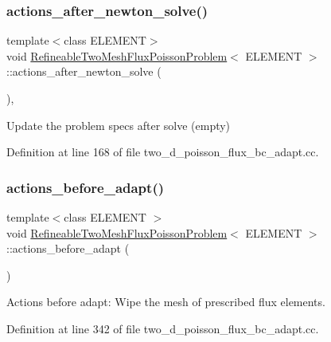 \subsubsection{\texorpdfstring{actions\+\_\+after\+\_\+newton\+\_\+solve()}{actions\_after\_newton\_solve()}}
{\footnotesize\ttfamily template$<$class E\+L\+E\+M\+E\+NT$>$ \\
void \hyperlink{classRefineableTwoMeshFluxPoissonProblem}{Refineable\+Two\+Mesh\+Flux\+Poisson\+Problem}$<$ E\+L\+E\+M\+E\+NT $>$\+::actions\+\_\+after\+\_\+newton\+\_\+solve (\begin{DoxyParamCaption}{ }\end{DoxyParamCaption})\hspace{0.3cm}{\ttfamily [inline]}, {\ttfamily [private]}}



Update the problem specs after solve (empty) 



Definition at line 168 of file two\+\_\+d\+\_\+poisson\+\_\+flux\+\_\+bc\+\_\+adapt.\+cc.

\mbox{\label{classRefineableTwoMeshFluxPoissonProblem_a10d2a67a5ac599161ddcf876b31334f6}} 
\subsubsection{\texorpdfstring{actions\+\_\+before\+\_\+adapt()}{actions\_before\_adapt()}}
{\footnotesize\ttfamily template$<$class E\+L\+E\+M\+E\+NT $>$ \\
void \hyperlink{classRefineableTwoMeshFluxPoissonProblem}{Refineable\+Two\+Mesh\+Flux\+Poisson\+Problem}$<$ E\+L\+E\+M\+E\+NT $>$\+::actions\+\_\+before\+\_\+adapt (\begin{DoxyParamCaption}{ }\end{DoxyParamCaption})\hspace{0.3cm}{\ttfamily [private]}}



Actions before adapt\+: Wipe the mesh of prescribed flux elements. 



Definition at line 342 of file two\+\_\+d\+\_\+poisson\+\_\+flux\+\_\+bc\+\_\+adapt.\+cc.



